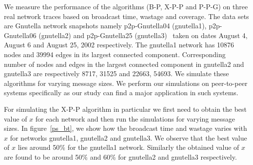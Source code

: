 We measure 
the performance of the algorithms (B-P, X-P-P and P-P-G) on three real network traces based on broadcast time, 
wastage and coverage. The data sets are Gnutella network snapshots namely 
p2p-Gnutella04 (gnutella1), p2p-Gnutella06 (gnutella2) and p2p-Gnutella25 (gnutella3)~\cite{leskovec2007graph,ripeanu2002mapping} taken on dates August 4, August 6 and August 25, 2002 respectively. 
The gnutella1 network has 10876 nodes and 39994 edges in its largest connected component. Corresponding number of nodes and edges in the largest connected component 
in gnutella2 and gnutella3 are respectively 8717, 31525 and 22663, 54693. We simulate these algorithms for varying message sizes.
We perform our simulations on peer-to-peer systems specifically as our study can find a major application in such systems.

For simulating the X-P-P algorithm in particular we first need to obtain the best value of $x$ for each network and then run the simulations for varying message sizes. 
 In figure~\ref{ps_bt}, we show how the broadcast time and wastage varies with $x$ for networks gnutella1, gnutella2 and gnutella3. We observe that the best value of $x$ lies around 
 50\% for the gnutella1 network. Similarly the obtained value of $x$ are found to be around 50\% and 60\% for gnutella2 and gnutella3 
 respectively.
% 
